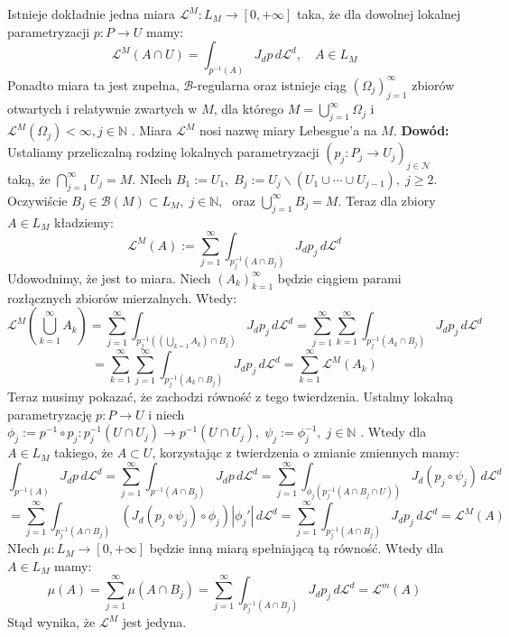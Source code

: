 \begin{tw}
	Istnieje dokładnie jedna miara $\mathcal{L}^M: L_M \rightarrow [0, +\infty]$ taka, że dla dowolnej lokalnej parametryzacji $p: P \rightarrow U$ mamy: $$
		\mathcal{L}^M(A \cap U) = \int_{p^{-1}(A)} J_dp \, d \mathcal{L}^d, \quad A \in L_M
	$$
	Ponadto miara ta jest zupełna, $\mathcal{B}$-regularna oraz istnieje ciąg $(\Omega_j)_{j=1}^{\infty}$ zbiorów otwartych i relatywnie zwartych w $M$, dla którego $M = \bigcup_{j=1}^{\infty} \Omega_j$ i $\mathcal{L}^M(\Omega_j) < \infty, j \in \mathbb{N}$ . Miara $\mathcal{L}^M$ nosi nazwę miary Lebesgue'a na $M$.
	\newline
	\textbf{Dowód:}\newline
	Ustaliamy przeliczalną rodzinę lokalnych parametryzacji $(p_j: P_j \rightarrow U_j)_{j \in \mathcal{N}}$ taką, że $\bigcap_{j=1}^{\infty} U_j = M$. NIech $B_1:= U_1, \; B_j := U_j \backslash (U_1 \cup \cdots \cup U_{j-1}), \; j \geq 2$. Oczywiście $B_j \in \mathcal{B}(M) \subset L_M, \; j \in \mathbb{N},\;$ oraz $\bigcup_{j=1}^{\infty} B_j = M$. Teraz dla zbiory $A \in L_M$ kładziemy: $$
		\mathcal{L}^M(A) := \sum_{j=1}^{\infty} \int_{p_j^{-1}(A \cap B_j)} J_dp_j \, d\mathcal{L}^d
	$$
	Udowodnimy, że jest to miara. Niech $(A_k)_{k=1}^{\infty}$ będzie ciągiem parami rozłącznych zbiorów mierzalnych. Wtedy: 
	$$
		\mathcal{L}^M(\bigcup_{k=1}^{\infty} A_k) 
		= \sum^{\infty}_{j=1} \int_{p_j^{-1}((\bigcup_{k=1} A_k) \cap B_j)} J_dp_j \, d\mathcal{L}^d
		= \sum_{j=1}^{\infty} \sum_{k=1}^{\infty} \int_{p_j^{-1}(A_k \cap B_j)} J_dp_j \, d \mathcal{L}^d
	$$
	$$
		= \sum_{k=1}^{\infty} \sum_{j=1}^{\infty} \int_{p_j^{-1}(A_k \cap B_j)} J_dp_j \, d \mathcal{L}^d
		= \sum_{k=1}^{\infty} \mathcal{L}^M(A_k)
	$$
	Teraz musimy pokazać, że zachodzi równość z tego twierdzenia. Ustalmy lokalną parametryzację $p: P \rightarrow U$  i niech $\phi_j := p^{-1} \circ p_j:p^{-1}_j(U \cap U_j) \rightarrow p^{-1}(U \cap U_j), \; \psi_j := \phi_j^{-1}, \; j \in \mathbb{N}$ . Wtedy dla $A \in L_M$ takiego, że $A \subset U$, korzystając z twierdzenia o zmianie zmiennych mamy: $$
		\int_{p^{-1}(A)} J_dp \, d \mathcal{L}^d 
		= \sum_{j=1}^{\infty} \int_{p^{-1}(A \cap B_j)} J_dp \, d \mathcal{L}^d
		= \sum_{j=1}^{\infty} \int_{\phi_j(p_j^{-1}(A \cap B_j \cap U))} J_d(p_j \circ \psi_j) \, d \mathcal{L}^d
	$$
	$$
		= \sum_{j=1}^{\infty} \int_{p_j^{-1}(A \cap B_j)} (J_d(p_j \circ \psi_j) \circ \phi_j) |\phi_j'| \, d \mathcal{L}^d
		= \sum_{j=1}^{\infty} \int_{p_j^{-1}(A \cap B_j)} J_dp_j \, d \mathcal{L}^d = \mathcal{L}^M(A)
	$$
	NIech $\mu: L_M \rightarrow [0, +\infty]$ będzie inną miarą spełniającą tą równość. Wtedy dla $A \in L_M$ mamy: $$
		\mu(A) = \sum_{j=1}^{\infty} \mu(A \cap B_j) = \sum_{j=1}^{\infty} \int_{p_j^{-1}(A \cap B_j)} J_dp_j \, d \mathcal{L}^d = \mathcal{L}^m(A)
	$$
	Stąd wynika, że $\mathcal{L}^M$ jest jedyna.
\end{tw}